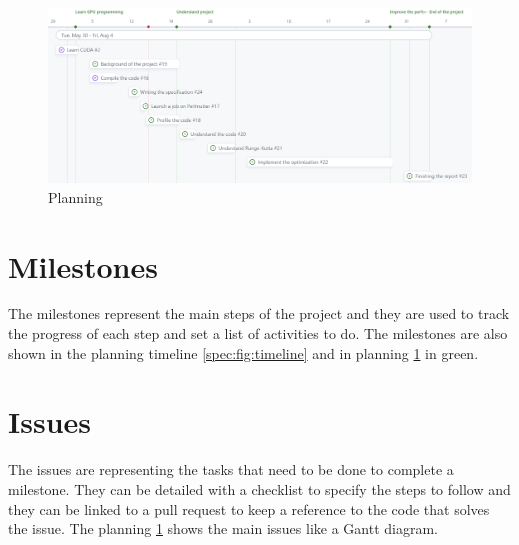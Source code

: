 \begin{figure}[ht]
    \centering
    \includegraphics[width=\textwidth]{05-resources/img/spec/planning-gh.png}
    \caption{Planning}
    \label{spec:fig:planning-gh}
\end{figure}


\section{Milestones}
\label{spec:ch:planning:milestones}

The milestones represent the main steps of the project and they are used to track the progress of each step and set a list of activities to do.
The milestones are also shown in the planning timeline \ref{spec:fig:timeline} and in planning \ref{spec:fig:planning-gh} in green.


\section{Issues}
\label{spec:ch:planning:issues}

The issues are representing the tasks that need to be done to complete a milestone.
They can be detailed with a checklist to specify the steps to follow and they can be linked to a pull request to keep a reference to the code that solves the issue.
The planning \ref{spec:fig:planning-gh} shows the main issues like a Gantt diagram.
